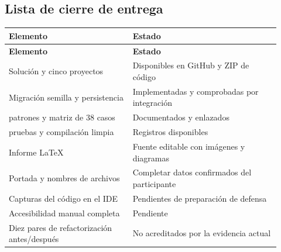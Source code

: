 \subsection{Lista de cierre de entrega}
\begingroup\small\setlength{\parskip}{1pt}\renewcommand{\arraystretch}{1.0}
\begingroup\small
\begin{longtable}{@{}>{\raggedright\arraybackslash}p{0.42\linewidth}>{\raggedright\arraybackslash}p{0.5\linewidth}@{}}
\toprule
\textbf{Elemento} & \textbf{Estado}\\
\midrule
\endfirsthead
\toprule
\textbf{Elemento} & \textbf{Estado}\\
\midrule
\endhead
Solución y cinco proyectos & Disponibles en GitHub y ZIP de código\\
Migración semilla y persistencia & Implementadas y comprobadas por integración\\
23 patrones y matriz de 38 casos & Documentados y enlazados\\
62 pruebas y compilación limpia & Registros disponibles\\
Informe LaTeX & Fuente editable con imágenes y diagramas\\
Portada y nombres de archivos & Completar datos confirmados del participante\\
Capturas del código en el IDE & Pendientes de preparación de defensa\\
Accesibilidad manual completa & Pendiente\\
Diez pares de refactorización antes/después & No acreditados por la evidencia actual\\
\bottomrule
\end{longtable}
\endgroup



\endgroup
